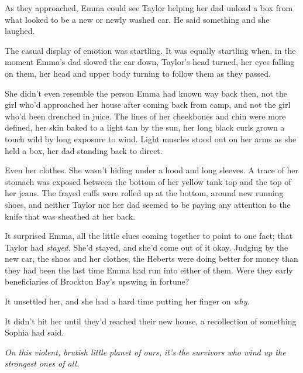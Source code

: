 As they approached, Emma could see Taylor helping her dad unload a box from what looked to be a new or newly washed car.  He said something and she laughed.



The casual display of emotion was startling.  It was equally startling when, in the moment Emma's dad slowed the car down, Taylor's head turned, her eyes falling on them, her head and upper body turning to follow them as they passed.



She didn't even resemble the person Emma had known way back then, not the girl who'd approached her house after coming back from camp, and not the girl who'd been drenched in juice.  The lines of her cheekbones and chin were more defined, her skin baked to a light tan by the sun, her long black curls grown a touch wild by long exposure to wind.  Light muscles stood out on her arms as she held a box, her dad standing back to direct.



Even her clothes.  She wasn't hiding under a hood and long sleeves.  A trace of her stomach was exposed between the bottom of her yellow tank top and the top of her jeans.  The frayed cuffs were rolled up at the bottom, around new running shoes, and neither Taylor nor her dad seemed to be paying any attention to the knife that was sheathed at her back.



It surprised Emma, all the little clues coming together to point to one fact; that Taylor had \emph{stayed.}  She'd stayed, and she'd come out of it okay.  Judging by the new car, the shoes and her clothes, the Heberts were doing better for money than they had been the last time Emma had run into either of them.  Were they early beneficiaries of Brockton Bay's upswing in fortune?



It unsettled her, and she had a hard time putting her finger on \emph{why}.



It didn't hit her until they'd reached their new house, a recollection of something Sophia had said.



\emph{On this violent, brutish little planet of ours, it's the survivors who wind up the strongest ones of all.}





